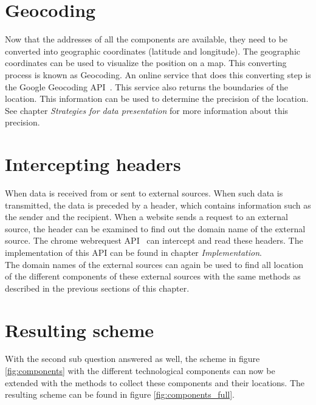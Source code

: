 \documentclass[twoside,openright,notitlepage]{uva-bachelor-thesis}
\begin{document}
\section{Geocoding}
Now that the addresses of all the components are available, they need to be converted into geographic coordinates (latitude and longitude). The geographic coordinates can be used to visualize the position on a map. This converting process is known as Geocoding. An online service that does this converting step is the Google Geocoding API~\cite{google1}. This service also returns the boundaries of the location. This information can be used to determine the precision of the location. See chapter \emph{Strategies for data presentation} for more information about this precision.

\section{Intercepting headers}
When data is received from or sent to external sources. When such data is transmitted, the data is preceded by a header, which contains information such as the sender and the recipient. When a website sends a request to an external source, the header can be examined to find out the domain name of the external source. The chrome webrequest API~\cite{google2} can intercept and read these headers. The implementation of this API can be found in chapter \emph{Implementation}.\\

The domain names of the external sources can again be used to find all location of the different components of these external sources with the same methods as described in the previous sections of this chapter.

\section{Resulting scheme}
With the second sub question answered as well, the scheme in figure \ref{fig:components} with the different technological components can now be extended with the methods to collect these components and their locations. The resulting scheme can be found in figure \ref{fig:components_full}.
\end{document}
